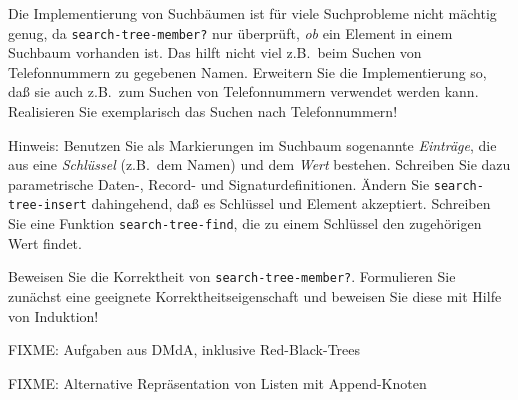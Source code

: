 \begin{aufgabe}
  Die Implementierung von Suchbäumen ist für viele Suchprobleme nicht
  mächtig genug, da \texttt{search-tree-member?} nur überprüft,
  \emph{ob} ein Element in einem Suchbaum vorhanden ist.  Das hilft
  nicht viel z.B.\ beim Suchen von Telefonnummern zu gegebenen Namen.
  Erweitern Sie die Implementierung so, daß sie auch z.B.\ zum Suchen
  von Telefonnummern verwendet werden kann.  Realisieren Sie
  exemplarisch das Suchen nach Telefonnummern!

  Hinweis: Benutzen Sie als Markierungen im Suchbaum sogenannte
  \textit{Einträge}, die aus eine \textit{Schlüssel} (z.B.\ dem Namen)
  und dem \textit{Wert} bestehen.  Schreiben Sie dazu parametrische Daten-,
  Record- und Signaturdefinitionen. Ändern Sie \texttt{search-tree-insert}
  dahingehend, daß es Schlüssel und Element akzeptiert.  Schreiben Sie eine
  Funktion \texttt{search-tree-find}, die zu einem Schlüssel den
  zugehörigen Wert findet.
\end{aufgabe}

\begin{aufgabe}
  Beweisen Sie die Korrektheit von \texttt{search-tree-member?}.
  Formulieren Sie zunächst eine geeignete Korrektheitseigenschaft und
  beweisen Sie diese mit Hilfe von Induktion!
\end{aufgabe}

\begin{aufgabe}
  FIXME: Aufgaben aus DMdA, inklusive Red-Black-Trees
\end{aufgabe}

\begin{aufgabe}
  FIXME: Alternative Repräsentation von Listen mit Append-Knoten
\end{aufgabe}

